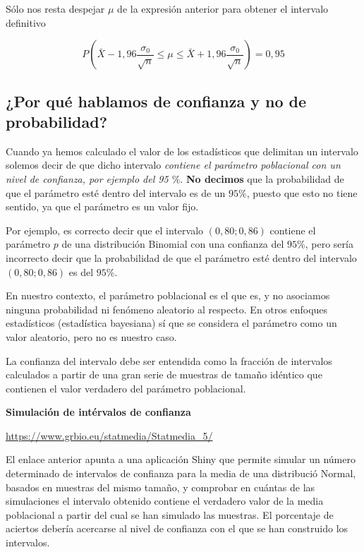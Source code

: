 \documentclass[
]{article}
\begin{document}
Sólo nos resta despejar \(\mu\) de la expresión anterior para obtener el intervalo definitivo

\[
P\left(\bar{X}-1,96 \frac{\sigma_{0}}{\sqrt{n}} \leq \mu \leq \bar{X}+1,96 \frac{\sigma_{0}}{\sqrt{n}}\right)=0,95
\]

\subsection{¿Por qué hablamos de confianza y no de probabilidad?}\label{por-quuxe9-hablamos-de-confianza-y-no-de-probabilidad}

Cuando ya hemos calculado el valor de los estadísticos que delimitan un intervalo solemos decir de que dicho intervalo \emph{contiene el parámetro poblacional con un nivel de confianza, por ejemplo del 95 \(\%\)}. \textbf{No decimos} que la probabilidad de que el parámetro esté dentro del intervalo es de un \(95 \%\), puesto que esto no tiene sentido, ya que el parámetro es un valor fijo.

Por ejemplo, es correcto decir que el intervalo \((0,80 ; 0,86)\) contiene el parámetro \(p\) de una distribución Binomial con una confianza del \(95 \%\), pero sería incorrecto decir que la probabilidad de que el parámetro esté dentro del intervalo \((0,80 ; 0,86)\) es del \(95 \%\).

En nuestro contexto, el parámetro poblacional es el que es, y no asociamos ninguna probabilidad ni fenómeno aleatorio al respecto. En otros enfoques estadísticos (estadística bayesiana) sí que se considera el parámetro como un valor aleatorio, pero no es nuestro caso.

La confianza del intervalo debe ser entendida como la fracción de intervalos calculados a partir de una gran serie de muestras de tamaño idéntico que contienen el valor verdadero del parámetro poblacional.

\textbf{Simulación de intérvalos de confianza}

\url{https://www.grbio.eu/statmedia/Statmedia_5/}

El enlace anterior apunta a una aplicación Shiny que permite simular un número determinado de intervalos de confianza para la media de una distribució Normal, basados en muestras del mismo tamaño, y comprobar en cuántas de las simulaciones el intervalo obtenido contiene el verdadero valor de la media poblacional a partir del cual se han simulado las muestras. El porcentaje de aciertos debería acercarse al nivel de confianza con el que se han construido los intervalos.
\end{document}
